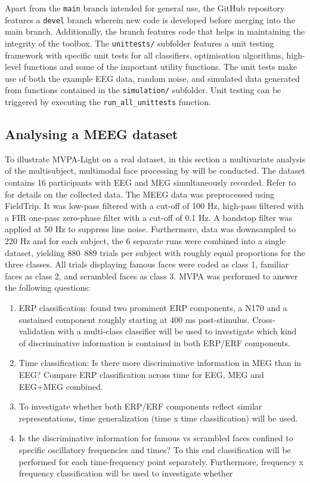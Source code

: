 \documentclass[utf8]{frontiersSCNS} %
\newcommand{\ttt}[1]{\texttt{#1}}
\begin{document}
Apart from the \ttt{main} branch intended for general use, the GitHub repository features a \ttt{devel} branch wherein new code is developed before merging into the main branch. Additionally, the branch features code that helps in maintaining the integrity of the toolbox. The \ttt{unittests/} subfolder features a unit testing framework with specific unit tests for all classifiers, optimisation algorithms, high-level functions and some of the important utility functions. The unit tests make use of both the example EEG data, random noise, and simulated data generated from functions contained in the \ttt{simulation/} subfolder. Unit testing can be triggered by executing the \ttt{run\_all\_unittests} function.

\subsection{Analysing a MEEG dataset}

To illustrate MVPA-Light on a real dataset, in this section a multivariate analysis of the multisubject, multimodal face processing by \citep{Wakeman2015ADataset,Wakeman2014OpenfMRI} will be conducted. The dataset contains 16 participants with EEG and MEG simultaneously recorded. Refer to  \cite{Wakeman2015ADataset} for details on the collected data. The MEEG data was preprocessed using FieldTrip. It was low-pass filtered with a cut-off of 100 Hz, high-pass filtered with a FIR one-pass zero-phase filter with a cut-off of 0.1 Hz. A bandstop filter was applied at 50 Hz to suppress line noise. Furthermore, data was downsampled to 220 Hz and for each subject, the 6 separate runs were combined into a single dataset, yielding 880--889 trials per subject with roughly equal proportions for the three classes. All trials displaying famous faces were coded as class 1, familiar faces as class 2, and scrambled faces as class 3. MVPA was performed to answer the following questions:

\begin{enumerate}
    \item ERP classification: \cite{Wakeman2015ADataset} found two prominent ERP components, a N170 and a sustained component roughly starting at 400 ms post-stimulus. Cross-validation with a multi-class classifier will be used to investigate which kind of discriminative information is contained in both ERP/ERF components.
    \item Time classification: Is there more discriminative information in MEG than in EEG? Compare ERP classification across time for EEG, MEG and EEG+MEG combined. 
    \item To investigate whether both ERP/ERF components reflect similar representations, time generalization (time x time classification) will be used.
    \item Is the discriminative information for famous vs scrambled faces confined to specific oscillatory frequencies and times? To this end classification will be performed for each time-frequency point separately. Furthermore, frequency x frequency classification will be used to investigate whether 

\end{enumerate}
\end{document}

